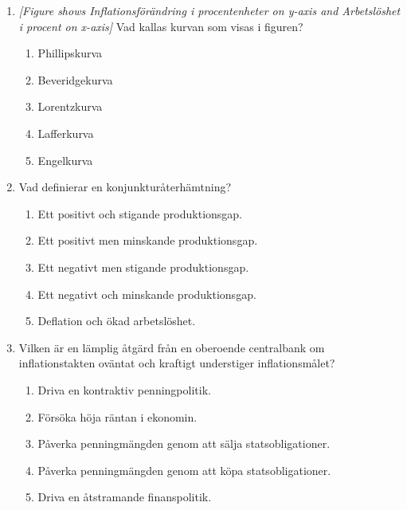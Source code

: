 \documentclass[12pt,a4paper]{article}
\begin{document}
\begin{enumerate}[label=\arabic*.]
    \begin{enumerate}[label=\alph*)]
        \item 5.4\%
        \item 5.8\%
        \item 6.1\%
        \item 9.3\%
        \item Inget av ovanstående alternativ är korrekt.
    \end{enumerate}

    \item \textit{[Figure shows Inflationsförändring i procentenheter on y-axis and Arbetslöshet i procent on x-axis]} Vad kallas kurvan som visas i figuren?
    \begin{enumerate}[label=\alph*)]
        \item Phillipskurva
        \item Beveridgekurva
        \item Lorentzkurva
        \item Lafferkurva
        \item Engelkurva
    \end{enumerate}

    \item Vad definierar en konjunkturåterhämtning?
    \begin{enumerate}[label=\alph*)]
        \item Ett positivt och stigande produktionsgap.
        \item Ett positivt men minskande produktionsgap.
        \item Ett negativt men stigande produktionsgap.
        \item Ett negativt och minskande produktionsgap.
        \item Deflation och ökad arbetslöshet.
    \end{enumerate}

    \item Vilken är en lämplig åtgärd från en oberoende centralbank om inflationstakten oväntat och kraftigt understiger inflationsmålet?
    \begin{enumerate}[label=\alph*)]
        \item Driva en kontraktiv penningpolitik.
        \item Försöka höja räntan i ekonomin.
        \item Påverka penningmängden genom att sälja statsobligationer.
        \item Påverka penningmängden genom att köpa statsobligationer.
        \item Driva en åtstramande finanspolitik.
    \end{enumerate}


\end{enumerate}
\end{document}
